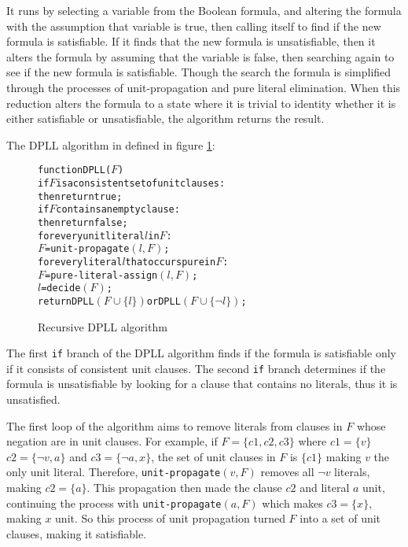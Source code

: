 It runs by selecting a variable from the Boolean formula, and altering the formula with the assumption that variable is true, then calling itself to find if the new formula is satisfiable.
If it finds that the new formula is unsatisfiable, then it alters the formula by assuming that the variable is false, then searching again to see if the new formula is satisfiable.
Though the search the formula is simplified through the processes of unit-propagation and pure literal elimination.
When this reduction alters the formula to a state where it is trivial to identity whether it is either satisfiable or unsatisfiable, the algorithm returns the result.

The DPLL algorithm in defined in figure \ref{impl.DPLL}:

\begin{figure}[h]
\begin{center}
\begin{alltt}
function DPLL(\(F\))
   if \(F\) is a consistent set of unit clauses:
       then return true;
   if \(F\) contains an empty clause:
       then return false;
   for every unit literal \(l\) in \(F\):
      \(F\) = unit-propagate\((l, F)\);
   for every literal \(l\) that occurs pure in \(F\):
      \(F\) = pure-literal-assign\((l, F)\);
   \(l\) = decide\((F)\);
   return DPLL\((F \cup \{l\})\) or DPLL\((F \cup \{\neg l\})\);
  		
\end{alltt}
  \caption{Recursive DPLL algorithm}
  \label{impl.DPLL}
\end{center}
\end{figure}

The first \verb+if+ branch of the DPLL algorithm finds if the formula is satisfiable only if it consists of consistent unit clauses.
The second \verb+if+ branch determines if the formula is unsatisfiable by looking for a clause that contains no literals, thus it is unsatisfied.

The first loop of the algorithm aims to remove literals from clauses in $F$ whose negation are in unit clauses.
For example, if $F = \{c1,c2,c3\}$ where $c1 = \{v\}$ $c2 = \{\neg v, a\}$ and $c3 = \{\neg a , x\}$,
the set of unit clauses in $F$ is $\{c1\}$ making $v$ the only unit literal.
Therefore, \verb+unit-propagate+$(v,F)$ removes all $\neg v$ literals, making $c2 = \{a\}$.
This propagation then made the clause $c2$ and literal $a$ unit, continuing the process with \verb+unit-propagate+$(a,F)$ which makes $c3 = \{x\}$, making $x$ unit.
So this process of unit propagation turned $F$ into a set of unit clauses, making it satisfiable.

